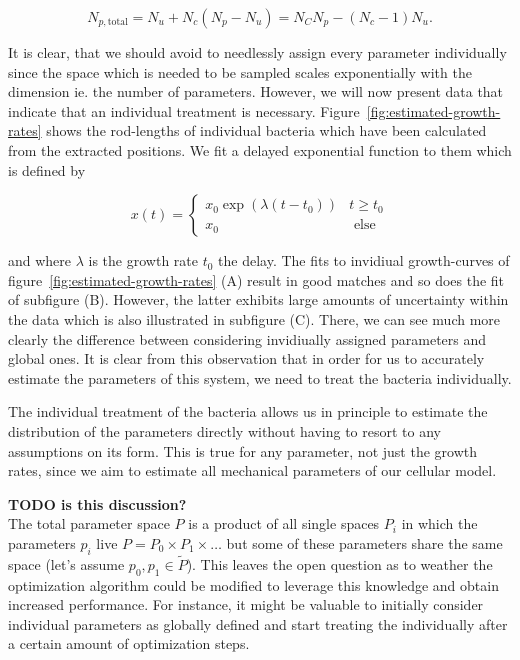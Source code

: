 \documentclass{article}
\begin{document}
\begin{equation}
    N_{p,\text{total}} = N_u + N_c (N_p - N_u) = N_C N_p - (N_c - 1) N_u.
\end{equation}

It is clear, that we should avoid to needlessly assign every parameter individually since the space
which is needed to be sampled scales exponentially with the dimension ie. the number of parameters.
However, we will now present data that indicate that an individual treatment is necessary.
Figure~\ref{fig:estimated-growth-rates} shows the rod-lengths of individual bacteria which have been
calculated from the extracted positions.
We fit a delayed exponential function to them which is defined by

\begin{equation}
    x(t) =
    \left\{\begin{array}{ll}
            x_0 \exp(\lambda (t-t_0)) & t\geq t_0\\
            x_0 & \text{ else}
    \end{array}\right.
\end{equation}

and where $\lambda$ is the growth rate $t_0$ the delay.
The fits to invidiual growth-curves of figure~\ref{fig:estimated-growth-rates} (A) result in good
matches and so does the fit of subfigure (B).
However, the latter exhibits large amounts of uncertainty within the data which is also illustrated
in subfigure (C).
There, we can see much more clearly the difference between considering invidiually assigned
parameters and global ones.
It is clear from this observation that in order for us to accurately estimate the parameters of this
system, we need to treat the bacteria individually.

The individual treatment of the bacteria allows us in principle to estimate the distribution of the
parameters directly without having to resort to any assumptions on its form.
This is true for any parameter, not just the growth rates, since we aim to estimate all mechanical
parameters of our cellular model.

\textbf{TODO is this discussion?}\\
The total parameter space $P$ is a product of all single spaces $P_i$ in which the parameters
$p_i$ live $P=P_0\times P_1\times\dots$ but some of these parameters share the same space (let's
assume $p_0,p_1\in \tilde{P}$).
This leaves the open question as to weather the optimization algorithm could be modified to leverage
this knowledge and obtain increased performance.
For instance, it might be valuable to initially consider individual parameters as globally defined
and start treating the individually after a certain amount of optimization steps.
\end{document}
